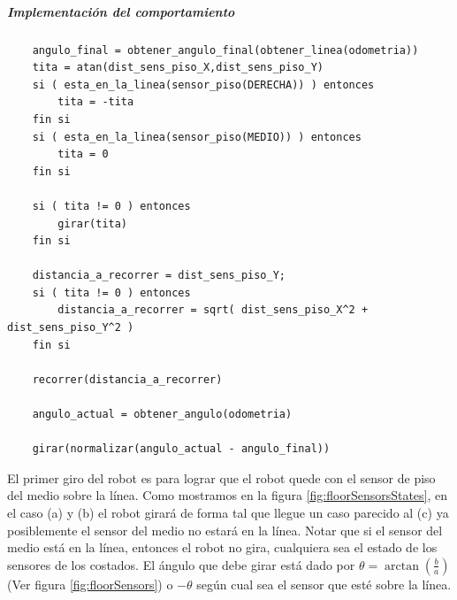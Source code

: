\subparagraph{Implementaci\'on del comportamiento}
\begin{verbatim}
    angulo_final = obtener_angulo_final(obtener_linea(odometria))
    tita = atan(dist_sens_piso_X,dist_sens_piso_Y)
    si ( esta_en_la_linea(sensor_piso(DERECHA)) ) entonces
        tita = -tita
    fin si
    si ( esta_en_la_linea(sensor_piso(MEDIO)) ) entonces
        tita = 0
    fin si

    si ( tita != 0 ) entonces
        girar(tita)
    fin si

    distancia_a_recorrer = dist_sens_piso_Y;
    si ( tita != 0 ) entonces
        distancia_a_recorrer = sqrt( dist_sens_piso_X^2 + dist_sens_piso_Y^2 )
    fin si

    recorrer(distancia_a_recorrer)

    angulo_actual = obtener_angulo(odometria)

    girar(normalizar(angulo_actual - angulo_final))
\end{verbatim}

El primer giro del robot es para lograr que el robot quede con el sensor de piso del medio
sobre la l\'inea. Como mostramos en la figura \ref{fig:floorSensorsStates}, en el caso (a) y (b)
el robot girar\'a de forma tal que llegue un caso parecido al (c) ya posiblemente el sensor del
medio no estar\'a en la l\'inea. Notar que si el sensor del medio est\'a en
la l\'inea, entonces el robot no gira, cualquiera sea el estado de los sensores de los costados.
El \'angulo que debe girar est\'a dado por $\theta = \arctan (\frac{b}{a})$ (Ver figura
\ref{fig:floorSensors}) o $-\theta$ seg\'un cual sea el sensor que est\'e sobre la l\'inea.

